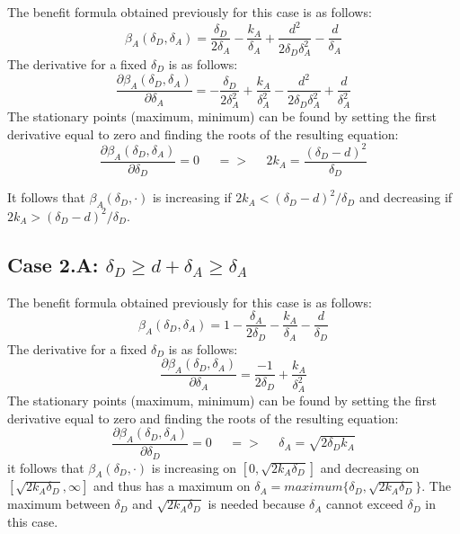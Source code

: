 The benefit formula obtained previously for this case is as follows:
\begin{equation*}
\beta_{A}(\delta_{D},\delta_{A}) =\dfrac{\delta_{D}}{2\delta_{A}} - \dfrac{k_{A}}{\delta_{A}} + \dfrac{d^{2}}{2\delta_{D}\delta_{A}^{2}} - \dfrac{d}{\delta_{A}}
\end{equation*}
The derivative for a fixed $\delta_{D}$ is as follows:
\begin{equation*}
\dfrac{\partial \beta_{A}(\delta_{D},\delta_{A})}{\partial \delta_{A}} = -\dfrac{\delta_{D}}{2\delta_{A}^{2}} + \dfrac{k_{A}}{\delta_{A}^{2}} - \dfrac{d^{2}}{2\delta_{D}\delta_{A}^{2}} + \dfrac{d}{\delta_{A}^{2}}
\end{equation*}
The stationary points (maximum, minimum) can be found by setting the first derivative equal to zero and finding the roots of the resulting equation:
\begin{equation*}
\frac{\partial \beta_{A}(\delta_{D},\delta_{A})}{\partial \delta_{D}} =0 ~~~~~~ =>~~~~~~ 2k_{A} = \dfrac{(\delta_{D}-d)^{2}}{\delta_{D}}
\end{equation*}

It follows that $\beta_{A}(\delta_{D},\cdot)$ is increasing if $2k_{A} < (\delta_{D} - d)^{2} / \delta_{D}$ and decreasing if $2k_{A} > (\delta_{D} - d)^{2} / \delta_{D}$. \\

\subsection*{Case 2.A: $\delta_{D} \geq d+\delta_{A} \geq \delta_{A} $ }
The benefit formula obtained previously for this case is as follows:
\begin{equation*}
\beta_{A}(\delta_{D},\delta_{A}) =1- \dfrac{\delta_{A}}{2\delta_{D}} - \dfrac{k_{A}}{\delta_{A}} - \dfrac{d}{\delta_{D}}
\end{equation*}
The derivative for a fixed $\delta_{D}$ is as follows:
\begin{equation*}
\dfrac{\partial \beta_{A}(\delta_{D},\delta_{A})}{\partial \delta_{A}} = \dfrac{-1}{2\delta_{D}} + \dfrac{k_{A}}{\delta_{A}^{2}}
\end{equation*}
The stationary points (maximum, minimum) can be found by setting the first derivative equal to zero and finding the roots of the resulting equation:
\begin{equation*}
\frac{\partial \beta_{A}(\delta_{D},\delta_{A})}{\partial \delta_{D}} =0 ~~~~~~ =>~~~~~~ \delta_{A} = \sqrt{2\delta_{D}k_{A}}
\end{equation*}
it follows that $\beta_{A}(\delta_{D},\cdot)$ is increasing on $[0,\sqrt{2k_{A}\delta_{D}}]$ and decreasing on $[\sqrt{2k_{A}\delta_{D}}, \infty]$ and thus has a maximum on $\delta_{A} = maximum \{\delta_{D}, \sqrt{2k_{A}\delta_{D}} \} $. The maximum between $\delta_{D}$ and $ \sqrt{2k_{A}\delta_{D}}$ is needed because $\delta_{A} $ cannot exceed $\delta_{D}$ in this case. \\


